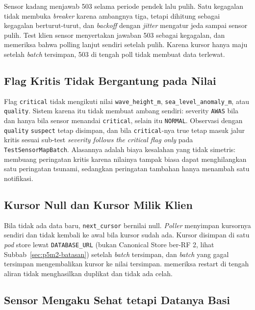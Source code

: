 Sensor kadang menjawab 503 selama periode pendek lalu pulih. Satu kegagalan tidak membuka \textit{breaker} karena ambangnya tiga, tetapi dihitung sebagai kegagalan berturut-turut, dan \textit{backoff} dengan \textit{jitter} mengatur jeda sampai sensor pulih. Test klien sensor menyertakan jawaban 503 sebagai kegagalan, dan  memeriksa bahwa polling lanjut sendiri setelah pulih. Karena kursor hanya maju setelah \textit{batch} tersimpan, 503 di tengah poll tidak membuat data terlewat.

\subsection{Flag Kritis Tidak Bergantung pada Nilai}

Flag \texttt{critical} tidak mengikuti nilai \texttt{wave\_height\_m}, \texttt{sea\_level\_anomaly\_m}, atau \texttt{quality}. Sistem karena itu tidak membuat ambang sendiri: severity \texttt{AWAS} bila dan hanya bila sensor menandai \texttt{critical}, selain itu \texttt{NORMAL}. Observasi dengan \texttt{quality} \texttt{suspect} tetap disimpan, dan bila \texttt{critical}-nya true tetap masuk jalur kritis sesuai sub-test \textit{severity follows the critical flag only} pada \texttt{TestSensorMapBatch}. Alasannya adalah biaya kesalahan yang tidak simetris: membuang peringatan kritis karena nilainya tampak biasa dapat menghilangkan satu peringatan tsunami, sedangkan peringatan tambahan hanya menambah satu notifikasi.

\subsection{Kursor Null dan Kursor Milik Klien}

Bila tidak ada data baru, \texttt{next\_cursor} bernilai null. \textit{Poller} menyimpan kursornya sendiri dan tidak kembali ke awal bila kursor sudah ada. Kursor disimpan di satu \textit{pod} store lewat \texttt{DATABASE\_URL} (bukan Canonical Store ber-RF 2, lihat Subbab~\ref{sec:p5m2-batasan}) setelah \textit{batch} tersimpan, dan \textit{batch} yang gagal tersimpan mengembalikan kursor ke nilai tersimpan.  memeriksa restart di tengah aliran tidak menghasilkan duplikat dan tidak ada celah.

\subsection{Sensor Mengaku Sehat tetapi Datanya Basi}

